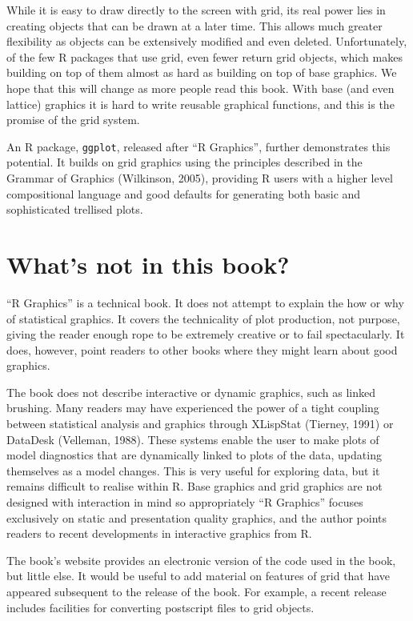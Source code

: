 \documentclass[12pt]{article}
\begin{document}
While it is easy to draw directly to the screen with grid, its real
power lies in creating objects that can be drawn at a later time. This
allows much greater flexibility as objects can be extensively modified
and even deleted.  Unfortunately, of the few R packages that use grid,
even fewer return grid objects, which makes building on top of them
almost as hard as building on top of base graphics.  We hope that this
will change as more people read this book. With base (and even
lattice) graphics it is hard to write reusable graphical functions,
and this is the promise of the grid system.

An R package, {\tt ggplot}, released after ``R Graphics'', further
demonstrates this potential. It builds on grid graphics using the
principles described in the Grammar of Graphics (Wilkinson, 2005),
providing R users with a higher level compositional language and good
defaults for generating both basic and sophisticated trellised plots.

\section{What's not in this book?} 

``R Graphics'' is a technical book. It does not attempt to explain the
how or why of statistical graphics.  It covers the technicality of
plot production, not purpose, giving the reader enough rope to be
extremely creative or to fail spectacularly. It does, however, point
readers to other books where they might learn about good graphics.

The book does not describe interactive or dynamic graphics, such as
linked brushing. Many readers may have experienced the power of a
tight coupling between statistical analysis and graphics through
XLispStat (Tierney, 1991) or DataDesk (Velleman, 1988). These systems
enable the user to make plots of model diagnostics that are
dynamically linked to plots of the data, updating themselves as a
model changes. This is very useful for exploring data, but it remains
difficult to realise within R. Base graphics and grid graphics are not
designed with interaction in mind so appropriately ``R Graphics''
focuses exclusively on static and presentation quality graphics, and
the author points readers to recent developments in interactive
graphics from R.

The book's website provides an electronic version of the code used in
the book, but little else. It would be useful to add material on
features of grid that have appeared subsequent to the release of the
book. For example, a recent release includes facilities for converting
postscript files to grid objects.
\end{document}

